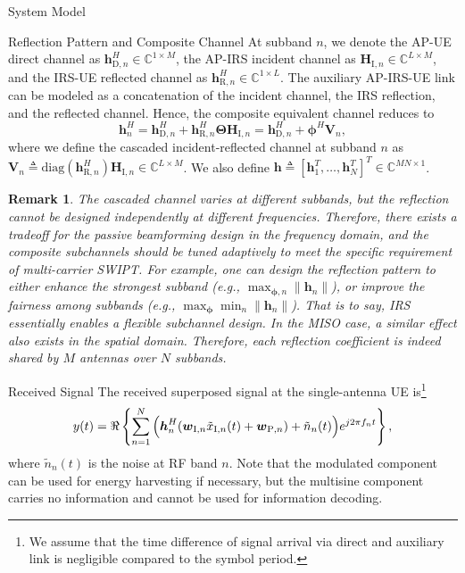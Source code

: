 \documentclass[journal,12pt,onecolumn,draftclsnofoot]{IEEEtran}
\newtheorem{remark}{Remark}
\begin{document}
\begin{section}{System Model}
\begin{subsection}{Reflection Pattern and Composite Channel}
			At subband $n$, we denote the AP-UE direct channel as $\boldsymbol{h}_{\mathrm{D},n}^H \in \mathbb{C}^{1 \times M}$, the AP-IRS incident channel as $\boldsymbol{H}_{\mathrm{I},n} \in \mathbb{C}^{L \times M}$, and the IRS-UE reflected channel as $\boldsymbol{h}_{\mathrm{R},n}^H \in \mathbb{C}^{1 \times L}$. The auxiliary AP-IRS-UE link can be modeled as a concatenation of the incident channel, the IRS reflection, and the reflected channel. Hence, the composite equivalent channel reduces to
			\begin{equation}\label{eq:h_n}
				\boldsymbol{h}_{n}^H = \boldsymbol{h}_{\mathrm{D},n}^H + \boldsymbol{h}_{\mathrm{R},n}^H \boldsymbol{\Theta} \boldsymbol{H}_{\mathrm{I},n} = \boldsymbol{h}_{\mathrm{D},n}^H + \boldsymbol{\phi}^H \boldsymbol{V}_{n},
			\end{equation}
			where we define the cascaded incident-reflected channel at subband $n$ as $\boldsymbol{V}_{n} \triangleq \mathrm{diag}(\boldsymbol{h}_{\mathrm{R},n}^H)\boldsymbol{H}_{\mathrm{I},n} \in \mathbb{C}^{L \times M}$. We also define $\boldsymbol{h} \triangleq [\boldsymbol{h}_1^T,\dots,\boldsymbol{h}_N^T]^T \in \mathbb{C}^{MN \times 1}$.

			\begin{remark}\label{re:subband_tradeoff}
				The cascaded channel varies at different subbands, but the reflection cannot be designed independently at different frequencies. Therefore, there exists a tradeoff for the passive beamforming design in the frequency domain, and the composite subchannels should be tuned adaptively to meet the specific requirement of multi-carrier SWIPT. For example, one can design the reflection pattern to either enhance the strongest subband (e.g., $\max_{\boldsymbol{\phi},n} \lVert \boldsymbol{h}_n \rVert$), or improve the fairness among subbands (e.g., $\max_{\boldsymbol{\phi}} \min_n \lVert \boldsymbol{h}_n \rVert$). That is to say, IRS essentially enables a flexible subchannel design. In the MISO case, a similar effect also exists in the spatial domain. Therefore, each reflection coefficient is indeed shared by $M$ antennas over $N$ subbands.
			\end{remark}
		\end{subsection}


		\begin{subsection}{Received Signal}
			The received superposed signal at the single-antenna UE is\footnote{We assume that the time difference of signal arrival via direct and auxiliary link is negligible compared to the symbol period.}
			\begin{equation}
				y(t) = \Re\left\{\sum_{n=1}^N{\Bigl(\boldsymbol{h}_{n}^H}{(\boldsymbol{w}_{\mathrm{I},n}\tilde{x}_{\mathrm{I},n}(t)+\boldsymbol{w}_{\mathrm{P},n})+\tilde{n}_n(t)\Bigr)}{e^{j2{\pi}{f_n}{t}}}\right\},
			\end{equation}
			where $\tilde{n}_n(t)$ is the noise at RF band $n$. Note that the modulated component can be used for energy harvesting if necessary, but the multisine component carries no information and cannot be used for information decoding.
		\end{subsection}



\end{section}
\end{document}
